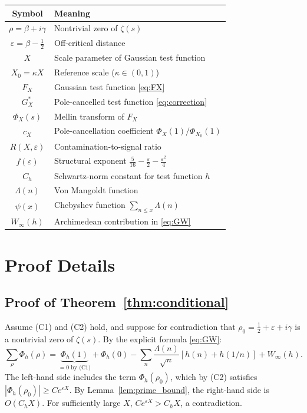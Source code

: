 \documentclass[12pt]{article}
\theoremstyle{remark}
\begin{document}
\begin{center}
\begin{tabular}{@{}cl@{}}
\toprule
Symbol & Meaning \\
\midrule
$\rho = \beta + i\gamma$ & Nontrivial zero of $\zeta(s)$ \\
$\varepsilon = \beta - \tfrac{1}{2}$ & Off-critical distance \\
$X$ & Scale parameter of Gaussian test function \\
$X_0 = \kappa X$ & Reference scale ($\kappa \in (0,1)$) \\
$F_X$ & Gaussian test function \eqref{eq:FX} \\
$G_X^*$ & Pole-cancelled test function \eqref{eq:correction} \\
$\Phi_X(s)$ & Mellin transform of $F_X$ \\
$c_X$ & Pole-cancellation coefficient $\Phi_X(1)/\Phi_{X_0}(1)$ \\
$R(X,\varepsilon)$ & Contamination-to-signal ratio \\
$f(\varepsilon)$ & Structural exponent $\tfrac{5}{16} - \tfrac{\varepsilon}{2}
  - \tfrac{\varepsilon^2}{4}$ \\
$C_h$ & Schwartz-norm constant for test function $h$ \\
$\Lambda(n)$ & Von Mangoldt function \\
$\psi(x)$ & Chebyshev function $\sum_{n \leq x} \Lambda(n)$ \\
$W_\infty(h)$ & Archimedean contribution in \eqref{eq:GW} \\
\bottomrule
\end{tabular}
\end{center}

\section{Proof Details}\label{app:proofs}

\subsection{Proof of Theorem~\ref{thm:conditional}}

Assume (C1) and (C2) hold, and suppose for contradiction that
$\rho_0 = \tfrac{1}{2} + \varepsilon + i\gamma$ is a nontrivial zero
of $\zeta(s)$. By the explicit formula \eqref{eq:GW}:
\[
\sum_\rho \Phi_h(\rho)
= \underbrace{\Phi_h(1)}_{= 0 \text{ by (C1)}} + \Phi_h(0)
  - \sum_n \frac{\Lambda(n)}{\sqrt{n}}[h(n)+h(1/n)] + W_\infty(h).
\]
The left-hand side includes the term $\Phi_h(\rho_0)$, which by (C2)
satisfies $|\Phi_h(\rho_0)| \geq C e^{\varepsilon X}$.
By Lemma~\ref{lem:prime_bound}, the right-hand side is $O(C_h X)$.
For sufficiently large $X$, $Ce^{\varepsilon X} > C_h X$, a contradiction.
\end{document}

